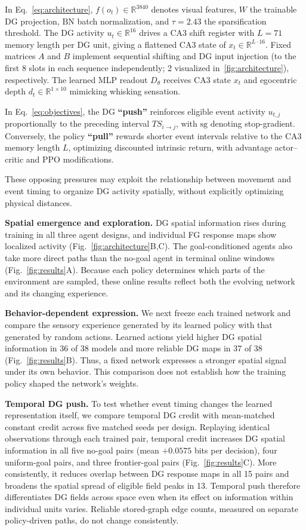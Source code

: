 \documentclass[letterpaper,12pt]{article}
\begin{document}
In Eq.~\eqref{eq:architecture}, $f(o_t)\in\mathbb{R}^{3840}$ denotes visual features, $W$ the trainable DG projection, $\mathrm{BN}$ batch normalization, and $\tau=2.43$ the sparsification threshold. The DG activity $u_t\in\mathbb{R}^{16}$ drives a CA3 shift register with $L=71$ memory length per DG unit, giving a flattened CA3 state of $x_t\in\mathbb R^{L\cdot16}$. Fixed matrices $A$ and $B$ implement sequential shifting and DG input injection (to the first 8 slots in each sequence independently; 2 visualized in~\ref{fig:architecture}), respectively. The learned MLP readout $D_\theta$ receives CA3 state $x_t$ and egocentric depth $d_t\in\mathbb{R}^{1\times10}$ mimicking whisking sensation.


In Eq.~\eqref{eq:objectives}, the DG \textbf{``push''} reinforces eligible event activity $u_{t,j}$ proportionally to the preceding interval $TS_{i\to j}$, with $\mathrm{sg}$ denoting stop-gradient. Conversely, the policy \textbf{``pull''} rewards shorter event intervals relative to the CA3 memory length $L$, optimizing discounted intrinsic return, with advantage actor--critic and PPO modifications.


These opposing pressures may exploit the relationship between movement and event timing to organize DG activity spatially, without explicitly optimizing physical distances.

\textbf{Spatial emergence and exploration.} DG spatial information rises during training in all three agent designs, and individual FG response maps show localized activity (Fig.~\ref{fig:architecture}B,C). The goal-conditioned agents also take more direct paths than the no-goal agent in terminal online windows (Fig.~\ref{fig:results}A). Because each policy determines which parts of the environment are sampled, these online results reflect both the evolving network and its changing experience.

\textbf{Behavior-dependent expression.} We next freeze each trained network and compare the sensory experience generated by its learned policy with that generated by random actions. Learned actions yield higher DG spatial information in 36 of 38 models and more reliable DG maps in 37 of 38 (Fig.~\ref{fig:results}B). Thus, a fixed network expresses a stronger spatial signal under its own behavior. This comparison does not establish how the training policy shaped the network's weights.

\textbf{Temporal DG push.} To test whether event timing changes the learned representation itself, we compare temporal DG credit with mean-matched constant credit across five matched seeds per design. Replaying identical observations through each trained pair, temporal credit increases DG spatial information in all five no-goal pairs (mean $+0.0575$ bits per decision), four uniform-goal pairs, and three frontier-goal pairs (Fig.~\ref{fig:results}C). More consistently, it reduces overlap between DG response maps in all 15 pairs and broadens the spatial spread of eligible field peaks in 13. Temporal push therefore differentiates DG fields across space even when its effect on information within individual units varies. Reliable stored-graph edge counts, measured on separate policy-driven paths, do not change consistently.
\end{document}
